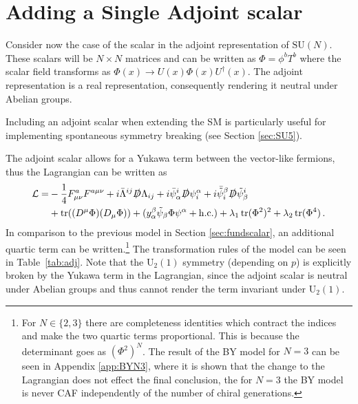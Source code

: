 \section{Adding a Single Adjoint scalar} \label{sec:adj}
Consider now the case of the scalar in the adjoint representation of $\mathrm{SU}(N)$. These scalars will be $N\times N$ matrices and can be written as $\Phi=\phi^bT^b$ where the scalar field transforms as $\Phi(x)\to U(x)\Phi(x)U^\dagger(x)$. The adjoint representation is a real representation, consequently rendering it neutral under Abelian groups. 

Including an adjoint scalar when extending the SM is particularly useful for implementing spontaneous symmetry breaking (see Section \ref{sec:SU5}). 

The adjoint scalar allows for a Yukawa term between the vector-like fermions, thus the Lagrangian can be written as 
\begin{align}
    \mathcal{L}= &-\frac{1}{4} F_{\mu\nu}^a F^{a\mu\nu}+ i \bar{\Lambda}^{ij} \slashed{D} \Lambda_{ij} 
    + i \bar{\psi}^i_\alpha \slashed{D} \psi_i^\alpha 
    + i \bar{\tilde{\psi}}_i^\beta \slashed{D} \tilde{\psi}^i_\beta\nonumber\\&+\operatorname{tr}((D^\mu\Phi)(D_\mu\Phi))+ (y^\beta_\alpha \tilde\psi_\beta \Phi\psi^{\alpha}+\mathrm{h.c.})+\lambda_1\operatorname{tr}(\Phi^2)^2+\lambda_2\operatorname{tr}(\Phi^4)
    \,.\label{eq:Ladj}
\end{align}
In comparison to the previous model in Section \ref{sec:fundscalar}, an additional quartic term can be written.\footnote{For $N\in\{2,3\}$ there are completeness identities which contract the indices and make the two quartic terms proportional. This is because the determinant goes as $(\Phi^2)^N$. The result of the BY model for $N=3$ can be seen in Appendix \ref{app:BYN3}, where it is shown that the change to the Lagrangian does not effect the final conclusion, the for $N=3$ the BY model is never CAF independently of the number of chiral generations. } The transformation rules of the model can be seen in Table~\ref{tab:adj}. Note that the $\mathrm{U}_2(1)$ symmetry (depending on $p$) is explicitly broken by the Yukawa term in the Lagrangian, since the adjoint scalar is neutral under Abelian groups and thus cannot render the term invariant under $\mathrm{U}_2(1)$.  

